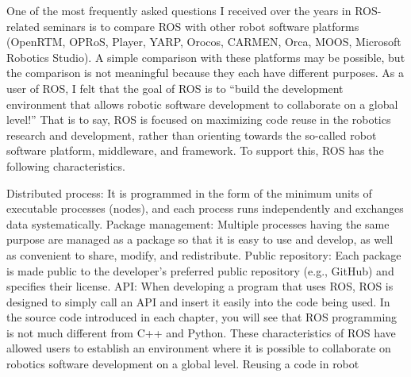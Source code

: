 One of the most frequently asked questions I received over the years in ROS-related seminars is to compare ROS with other robot software platforms (OpenRTM, OPRoS, Player, YARP, Orocos, CARMEN, Orca, MOOS, Microsoft Robotics Studio). A simple comparison with these platforms may be possible, but the comparison is not meaningful because they each have different purposes. As a user of ROS, I felt that the goal of ROS is to “build the development environment that allows robotic software development to collaborate on a global level!” That is to say, ROS is focused on maximizing code reuse in the robotics research and development, rather than orienting towards the so-called robot software platform, middleware, and framework. To support this, ROS has the following characteristics.


Distributed process: It is programmed in the form of the minimum units of executable processes (nodes), and each process runs independently and exchanges data systematically. Package management: Multiple processes having the same purpose are managed as a package so that it is easy to use and develop, as well as convenient to share, modify, and redistribute. Public repository: Each package is made public to the developer’s preferred public repository (e.g., GitHub) and specifies their license. API: When developing a program that uses ROS, ROS is designed to simply call an API and insert it easily into the code being used. In the source code introduced in each chapter, you will see that ROS programming is not much different from C++ and Python. These characteristics of ROS have allowed users to establish an environment where it is possible to collaborate on robotics software development on a global level. Reusing a code in robot 




